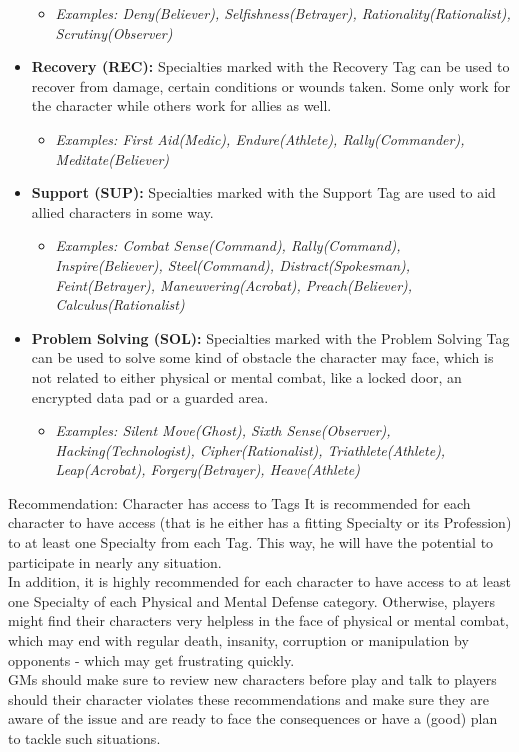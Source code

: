 \begin{itemize}
	\begin{itemize}
		\item \textit{Examples: Deny(Believer), Selfishness(Betrayer), Rationality(Rationalist), Scrutiny(Observer)}
	\end{itemize}
		\item \textbf{Recovery (REC):} Specialties marked with the Recovery Tag can be used to recover from damage, certain conditions or wounds taken. Some only work for the character while others work for allies as well.
	\begin{itemize}
		\item \textit{Examples: First Aid(Medic), Endure(Athlete), Rally(Commander), Meditate(Believer)}
	\end{itemize}
	\item \textbf{Support (SUP):} Specialties marked with the Support Tag are used to aid allied characters in some way.
	\begin{itemize}
		\item \textit{Examples: Combat Sense(Command), Rally(Command), Inspire(Believer), Steel(Command), Distract(Spokesman), Feint(Betrayer), Maneuvering(Acrobat), Preach(Believer), Calculus(Rationalist)}
	\end{itemize}
	\item \textbf{Problem Solving (SOL):} Specialties marked with the Problem Solving Tag can be used to solve some kind of obstacle the character may face, which is not related to either physical or mental combat, like a locked door, an encrypted data pad or a guarded area.
	\begin{itemize}
		\item \textit{Examples: Silent Move(Ghost), Sixth Sense(Observer), Hacking(Technologist), Cipher(Rationalist), Triathlete(Athlete), Leap(Acrobat), Forgery(Betrayer), Heave(Athlete)}
	\end{itemize}
\end{itemize}

\begin{DndSidebar}{Recommendation: Character has access to Tags}
It is recommended for each character to have access (that is he either has a fitting Specialty or its Profession) to at least one Specialty from each Tag. 
This way, he will have the potential to participate in nearly any situation.\\\noindent
In addition, it is highly recommended for each character to have access to at least one Specialty of each Physical and Mental Defense category.
Otherwise, players might find their characters very helpless in the face of physical or mental combat, which may end with regular death, insanity, corruption or manipulation by opponents - which may get frustrating quickly.\\
\noindent
GMs should make sure to review new characters before play and talk to players should their character violates these recommendations and make sure they are aware of the issue and are ready to face the consequences or have a (good) plan to tackle such situations.
\end{DndSidebar}

